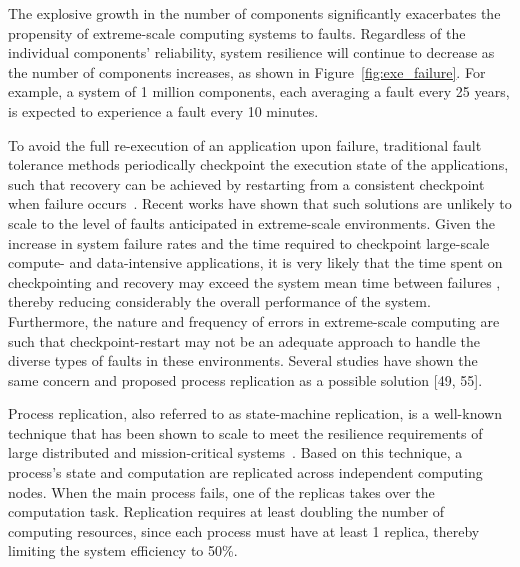 The explosive growth in the number of components significantly exacerbates the propensity of extreme-scale 
computing systems to faults. %
Regardless of the individual components' reliability, system
resilience will continue to decrease as the number of components increases, as shown in Figure~\ref{fig:exe_failure}. For example, a 
system of 1 million components, each averaging a fault every 25 years, is expected to experience a 
fault every 10 minutes.

To avoid the full 
re-execution of an application upon failure, traditional fault tolerance methods periodically checkpoint
the execution state of the applications, such that recovery
can be achieved by restarting from a consistent checkpoint when failure occurs~\cite{kalaiselvi_sadhana_2000}. 
Recent works \cite{mills_2014_icnc,riesen_sandia_2010} have shown that such solutions are unlikely to scale to the level of faults 
anticipated in extreme-scale environments. Given the increase in system failure rates and the time 
required to checkpoint large-scale compute- and data-intensive applications, it is very likely
that the time spent on checkpointing and recovery
may exceed the system mean time between failures \cite{riesen_sandia_2010}, %
thereby reducing considerably the overall performance of the
system. %
Furthermore, the nature and frequency of errors in extreme-scale computing are such that
checkpoint-restart may not be an adequate approach to handle the diverse types of faults in
these environments. 
Several studies have shown the same concern and proposed process replication as a
possible solution [49, 55]. 

Process replication, also referred to as state-machine replication, is a well-known technique that has been 
shown to scale to meet the resilience requirements of large distributed and mission-critical systems~\cite{schneider_1990_tutorial}.
Based on this technique, a process's state and computation are replicated across independent computing
nodes. When the main process fails, one of the replicas takes over the computation task. Replication 
requires at least doubling the number of computing resources, since each process must have at least 1 replica, thereby 
limiting the system efficiency to 50\%. %

